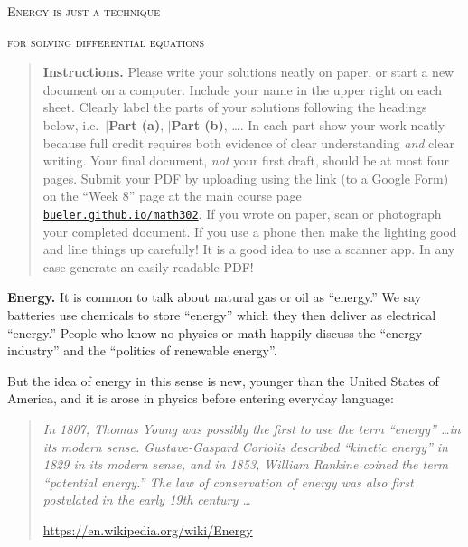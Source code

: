 \documentclass[12pt]{article}
\theoremstyle{definition}
\begin{document}
\renewcommand{\d}{\displaystyle}

\strut
\centerline{{\Large \textsc{Energy is just a technique}}}

\medskip

\centerline{{\Large \textsc{for solving differential equations}}}

\medskip
\small
\begin{quote}
\textbf{Instructions.}  Please write your solutions neatly on paper, or start a new document on a computer.  Include your name in the upper right on each sheet.  Clearly label the parts of your solutions following the headings below, i.e.~$\big|$\textbf{Part (a)}, $\big|$\textbf{Part (b)}, \dots.  In each part show your work neatly because full credit requires both evidence of clear understanding \emph{and} clear writing.  Your final document, \emph{not} your first draft, should be at most four pages.  Submit your PDF by uploading using the link (to a Google Form) on the ``Week 8'' page at the main course page \href{https://bueler.github.io/math302/index.html}{\texttt{bueler.github.io/math302}}.  If you wrote on paper, scan or photograph your completed document.  If you use a phone then make the lighting good and line things up carefully!  It is a good idea to use a scanner app.  In any case generate an easily-readable PDF!
\end{quote}

\normalsize
\bigskip
\renewcommand{\baselinestretch}{1.1}

\textbf{Energy.}  It is common to talk about natural gas or oil as ``energy.''   We say batteries use chemicals to store ``energy'' which they then deliver as electrical ``energy.''  People who know no physics or math happily discuss the ``energy industry'' and the ``politics of renewable energy''.

But the idea of energy in this sense is new, younger than the United States of America, and it is arose in physics before entering everyday language:

\small

\begin{quotation}
\noindent \emph{In 1807, Thomas Young was possibly the first to use the term ``energy'' \dots in its modern sense.  Gustave-Gaspard Coriolis described ``kinetic energy'' in 1829 in its modern sense, and in 1853, William Rankine coined the term ``potential energy.''  The law of conservation of energy was also first postulated in the early 19th century \dots}

\hfill \url{https://en.wikipedia.org/wiki/Energy}
\end{quotation}
\end{document}
